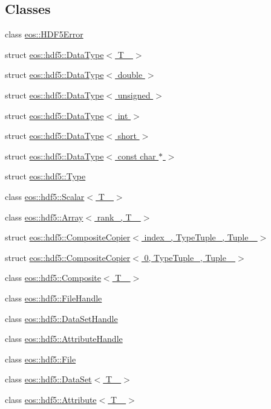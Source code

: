 \subsection*{Classes}
\begin{DoxyCompactItemize}
\item 
class \hyperlink{classeos_1_1HDF5Error}{eos::HDF5Error}
\item 
struct \hyperlink{structeos_1_1hdf5_1_1DataType}{eos::hdf5::DataType$<$ T\_\- $>$}
\item 
struct \hyperlink{structeos_1_1hdf5_1_1DataType_3_01double_01_4}{eos::hdf5::DataType$<$ double $>$}
\item 
struct \hyperlink{structeos_1_1hdf5_1_1DataType_3_01unsigned_01_4}{eos::hdf5::DataType$<$ unsigned $>$}
\item 
struct \hyperlink{structeos_1_1hdf5_1_1DataType_3_01int_01_4}{eos::hdf5::DataType$<$ int $>$}
\item 
struct \hyperlink{structeos_1_1hdf5_1_1DataType_3_01short_01_4}{eos::hdf5::DataType$<$ short $>$}
\item 
struct \hyperlink{structeos_1_1hdf5_1_1DataType_3_01const_01char_01_5_01_4}{eos::hdf5::DataType$<$ const char $\ast$ $>$}
\item 
struct \hyperlink{structeos_1_1hdf5_1_1Type}{eos::hdf5::Type}
\item 
class \hyperlink{classeos_1_1hdf5_1_1Scalar}{eos::hdf5::Scalar$<$ T\_\- $>$}
\item 
class \hyperlink{classeos_1_1hdf5_1_1Array}{eos::hdf5::Array$<$ rank\_\-, T\_\- $>$}
\item 
struct \hyperlink{structeos_1_1hdf5_1_1CompositeCopier}{eos::hdf5::CompositeCopier$<$ index\_\-, TypeTuple\_\-, Tuple\_\- $>$}
\item 
struct \hyperlink{structeos_1_1hdf5_1_1CompositeCopier_3_010_00_01TypeTuple___00_01Tuple___01_4}{eos::hdf5::CompositeCopier$<$ 0, TypeTuple\_\-, Tuple\_\- $>$}
\item 
class \hyperlink{classeos_1_1hdf5_1_1Composite}{eos::hdf5::Composite$<$ T\_\- $>$}
\item 
class \hyperlink{classeos_1_1hdf5_1_1FileHandle}{eos::hdf5::FileHandle}
\item 
class \hyperlink{classeos_1_1hdf5_1_1DataSetHandle}{eos::hdf5::DataSetHandle}
\item 
class \hyperlink{classeos_1_1hdf5_1_1AttributeHandle}{eos::hdf5::AttributeHandle}
\item 
class \hyperlink{classeos_1_1hdf5_1_1File}{eos::hdf5::File}
\item 
class \hyperlink{classeos_1_1hdf5_1_1DataSet}{eos::hdf5::DataSet$<$ T\_\- $>$}
\item 
class \hyperlink{classeos_1_1hdf5_1_1Attribute}{eos::hdf5::Attribute$<$ T\_\- $>$}
\end{DoxyCompactItemize}
